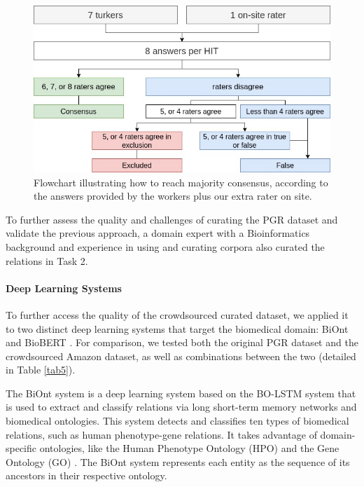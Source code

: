 \begin{figure}
\centering
\includegraphics[width=0.8\linewidth]{images/chapter_6/figure_3.jpg}
\caption[Flowchart Illustrating How to Reach Majority Consensus]{Flowchart illustrating how to reach majority consensus, according to the answers provided by the workers plus our extra rater on site.} \label{fig3}
\end{figure}

To further assess the quality and challenges of curating the PGR dataset and validate the previous approach, a domain expert with a Bioinformatics background and experience in using and curating corpora also curated the relations in Task 2. 

\paragraph{Deep Learning Systems}

To further access the quality of the crowdsourced curated dataset, we applied it to two distinct deep learning systems that target the biomedical domain: BiOnt \citep{sousa2020biont} and BioBERT \citep{lee2020biobert}. For comparison, we tested both the original PGR dataset and the crowdsourced Amazon dataset, as well as combinations between the two (detailed in Table \ref{tab5}).

The BiOnt system is a deep learning system based on the BO-LSTM system \citep{lamurias2019bo} that is used to extract and classify relations via long short-term memory networks and biomedical ontologies. This system detects and classifies ten types of biomedical relations, such as human phenotype-gene relations. It takes advantage of domain-specific ontologies, like the Human Phenotype Ontology (HPO) \citep{kohler2017human} and the Gene Ontology (GO) \citep{ashburner2000gene}. The BiOnt system represents each entity as the sequence of its ancestors in their respective ontology.

